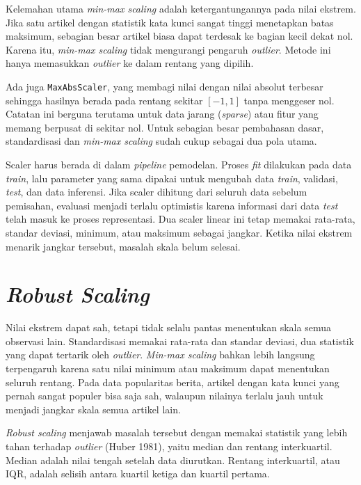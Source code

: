 Kelemahan utama \emph{min-max scaling} adalah ketergantungannya pada nilai ekstrem. Jika satu artikel dengan statistik kata kunci sangat tinggi menetapkan batas maksimum, sebagian besar artikel biasa dapat terdesak ke bagian kecil dekat nol. Karena itu, \emph{min-max scaling} tidak mengurangi pengaruh \emph{outlier}. Metode ini hanya memasukkan \emph{outlier} ke dalam rentang yang dipilih.

Ada juga \passthrough{\lstinline!MaxAbsScaler!}, yang membagi nilai dengan nilai absolut terbesar sehingga hasilnya berada pada rentang sekitar \([-1, 1]\) tanpa menggeser nol. Catatan ini berguna terutama untuk data jarang (\emph{sparse}) atau fitur yang memang berpusat di sekitar nol. Untuk sebagian besar pembahasan dasar, standardisasi dan \emph{min-max scaling} sudah cukup sebagai dua pola utama.

Scaler harus berada di dalam \emph{pipeline} pemodelan. Proses \emph{fit} dilakukan pada data \emph{train}, lalu parameter yang sama dipakai untuk mengubah data \emph{train}, validasi, \emph{test}, dan data inferensi. Jika scaler dihitung dari seluruh data sebelum pemisahan, evaluasi menjadi terlalu optimistis karena informasi dari data \emph{test} telah masuk ke proses representasi. Dua scaler linear ini tetap memakai rata-rata, standar deviasi, minimum, atau maksimum sebagai jangkar. Ketika nilai ekstrem menarik jangkar tersebut, masalah skala belum selesai.

\section{\texorpdfstring{\emph{Robust Scaling}}{Robust Scaling}}\label{robust-scaling}

Nilai ekstrem dapat sah, tetapi tidak selalu pantas menentukan skala semua observasi lain. Standardisasi memakai rata-rata dan standar deviasi, dua statistik yang dapat tertarik oleh \emph{outlier}. \emph{Min-max scaling} bahkan lebih langsung terpengaruh karena satu nilai minimum atau maksimum dapat menentukan seluruh rentang. Pada data popularitas berita, artikel dengan kata kunci yang pernah sangat populer bisa saja sah, walaupun nilainya terlalu jauh untuk menjadi jangkar skala semua artikel lain.

\emph{Robust scaling} menjawab masalah tersebut dengan memakai statistik yang lebih tahan terhadap \emph{outlier} (Huber 1981), yaitu median dan rentang interkuartil. Median adalah nilai tengah setelah data diurutkan. Rentang interkuartil, atau IQR, adalah selisih antara kuartil ketiga dan kuartil pertama.

